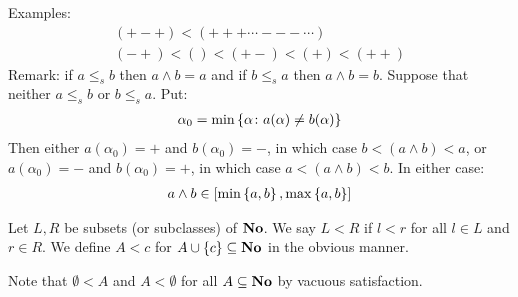 Examples: 
\begin{align*}
	(+-+) < (+++ \cdots --- \cdots) \\
	(-+) < () < (+-) < (+) < (++)
\end{align*}
Remark: if $a \leq_s b$ then $a \wedge b = a$ and if 
$b \leq_s a$ then $a \wedge b = b$. Suppose that neither 
$a \leq_s b$ or $b \leq_s a$. Put: 
\begin{align*}
	\alpha_0 = \min{ \left\{ \alpha \colon a(\alpha) \neq b(\alpha) \right\}}
\end{align*}
Then either $a(\alpha_0) = +$ and $b(\alpha_0) = -$, in which 
case $b < (a \wedge b) < a$, or $a(\alpha_0) = -$ and $b(\alpha_0) = +$, 
in which case $a < (a \wedge b) < b$. In either case: 
\begin{align*}
	a \wedge b \in \left[  \min{ \left\{ a, b \right\}, \max{ \left\{ a, b \right\}}} \right]
\end{align*}

\begin{defn}
	Let $L, R$ be subsets (or subclasses) of $\mathbf{No}$. We say 
	$L < R$ if $l < r$ for all $l \in L$ and $r \in R$. We define 
	$A < c$ for $A \cup \left\{ c \right\} \subseteq \mathbf{No}$ in the obvious manner. 
\end{defn}
Note that $\emptyset < A$ and $A < \emptyset$ for all $A \subseteq \mathbf{No}$ by 
vacuous satisfaction. 

